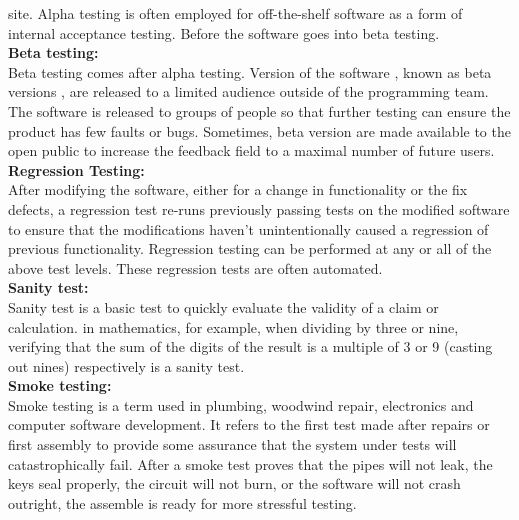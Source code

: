 site. Alpha testing is often employed for off-the-shelf software as a form of internal acceptance testing. Before the software goes 
into beta testing.\\[0.5cm]
\textbf{Beta testing:}\\
\hspace*{0.82cm}Beta testing comes after alpha testing. Version of the software , known as beta versions , are released to a limited 
audience outside of the programming team. The software is released to groups of people so that further testing can ensure the product 
has few faults or bugs. Sometimes, beta version are made available to the open public to increase the feedback field to a maximal 
number of future users.\\[0.5cm]
\textbf{Regression Testing:}\\
\hspace*{0.82cm}After modifying the software, either for a change in functionality or the fix defects, a regression test re-runs 
previously passing tests on the modified software to ensure that the modifications haven't unintentionally caused a regression of 
previous functionality. Regression testing can be performed at any or all of the above test levels. These regression tests are 
often automated.\\[0.5cm] 
\textbf{Sanity test:}\\
\hspace*{0.82cm}Sanity test is a basic test to quickly evaluate the validity of a claim or calculation. in mathematics, for example, 
when dividing by three or nine, verifying that the sum of the digits of the result is a multiple of 3 or 9 (casting out nines) 
respectively is a sanity test.\\[0.5cm]
\textbf{Smoke testing:}\\
\hspace*{0.82cm}Smoke testing is a term used in plumbing, woodwind repair, electronics and computer software development. It refers 
to the first test made after repairs or first assembly to provide some assurance that the system under tests will catastrophically 
fail. After a smoke test proves that the pipes will not leak, the keys seal properly, the circuit will not burn, or the software will 
not crash outright, the assemble is ready for more stressful testing.\\[0.5cm]
